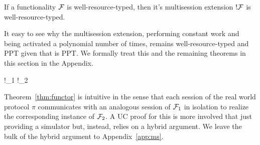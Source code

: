 %

\begin{theorem}[PPT !]\label{thm:bangppt}
If a functionality $\mathcal{F}$ is well-resource-typed, then it's multisession extension $!\mathcal{F}$ is well-resource-typed.
\end{theorem}

It easy to see why the multisession extension, performing constant work and being activated a polynomial number of times, remains well-resource-typed and PPT given that \F is PPT.
We formally treat this and the remaining theorems in this section in the Appendix.

\begin{theorem}\label{thm:functor}
	\begin{mathpar}
		{
			!\F_1 \xrightarrow{!\pi} !\F_2
		}
	\end{mathpar}
\end{theorem}
Theorem~\ref{thm:functor} is intuitive in the sense that each session of the real world protocol $\pi$ communicates with an analogous session of $\mathcal{F}_1$ in isolation to realize the corresponding instance of $\mathcal{F}_2$. 
A UC proof for this is more involved that just providing a simulator but, instead, relies on a hybrid argument. 
We leave the bulk of the hybrid argument to Appendix~\ref{app:ms}.

